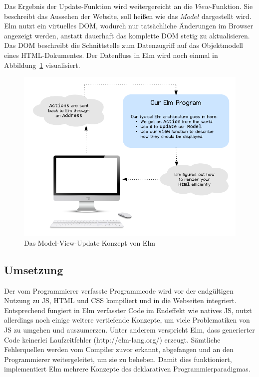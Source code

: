 Das Ergebnis der Update-Funktion wird weitergereicht an die $View$-Funktion. Sie beschreibt das Aussehen der Website, soll heißen wie das $Model$ dargestellt wird. Elm nutzt ein virtuelles \ac{DOM}, wodurch nur tatsächliche Änderungen im Browser angezeigt werden, anstatt dauerhaft das komplette \ac{DOM} stetig zu aktualisieren. Das \ac{DOM} beschreibt die Schnittstelle zum Datenzugriff auf das Objektmodell eines \ac{HTML}-Dokumentes.
Der Datenfluss in Elm wird noch einmal in Abbildung~\ref{fig:elm-model-view-update-concept} visualisiert.
\begin{figure}[h]
  \centering  
  \includegraphics[scale=1]{img/elm-model-view-update-concept.png}
  \caption{Das Model-View-Update Konzept von Elm}\label{fig:elm-model-view-update-concept}
\end{figure}

\subsection{Umsetzung}
\label{sec:Umsetzung}
Der vom Programmierer verfasste Programmcode wird vor der endgültigen Nutzung zu \ac{JS}, \ac{HTML} und \ac{CSS} kompiliert und in die Webseiten integriert. Entsprechend fungiert in Elm verfasster Code im Endeffekt wie natives \ac{JS}, nutzt allerdings noch einige weitere vertiefende Konzepte, um viele Problematiken von \ac{JS} zu umgehen und auszumerzen.
Unter anderem verspricht Elm, dass generierter Code keinerlei Laufzeitfehler (http://elm-lang.org/) erzeugt. Sämtliche Fehlerquellen werden vom Compiler zuvor erkannt, abgefangen und an den Programmierer weitergeleitet, um sie zu beheben. Damit dies funktioniert, implementiert Elm mehrere Konzepte des deklarativen Programmierparadigmas.

